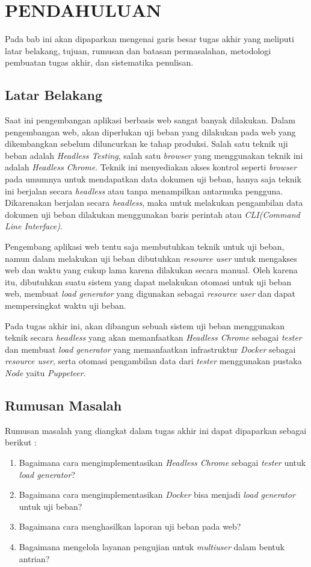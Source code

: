 \chapter{PENDAHULUAN}
	Pada bab ini akan dipaparkan mengenai garis besar tugas akhir yang meliputi latar belakang, tujuan, rumusan dan batasan permasalahan, metodologi pembuatan tugas akhir, dan sistematika penulisan.
        
	\section{Latar Belakang}
		Saat ini pengembangan aplikasi berbasis web sangat banyak dilakukan. Dalam pengembangan web, akan diperlukan uji beban yang dilakukan pada web yang dikembangkan sebelum diluncurkan ke tahap produksi. Salah satu teknik uji beban adalah \textit{Headless Testing}, salah satu \textit{browser} yang menggunakan teknik ini adalah \textit{Headless Chrome}. Teknik ini menyediakan akses kontrol seperti \textit{browser} pada umumnya untuk mendapatkan data dokumen uji beban, hanya saja teknik ini berjalan secara \textit{headless} atau tanpa menampilkan antarmuka pengguna. Dikarenakan berjalan secara \textit{headless}, maka untuk melakukan pengambilan data dokumen uji beban dilakukan menggunakan baris perintah atau \textit{CLI(Command Line Interface)}.
		
		\indent Pengembang aplikasi web tentu saja membutuhkan teknik untuk uji beban, namun dalam melakukan uji beban dibutuhkan \textit{resource user} untuk mengakses web dan waktu yang cukup lama karena dilakukan secara manual. Oleh karena itu, dibutuhkan suatu sistem yang dapat melakukan otomasi untuk uji beban web, membuat \textit{load generator} yang digunakan sebagai \textit{resource user} dan dapat mempersingkat waktu uji beban.
		
		\indent Pada tugas akhir ini, akan dibangun sebuah sistem uji beban menggunakan teknik secara \textit{headless} yang akan memanfaatkan \textit{Headless Chrome} sebagai \textit{tester} dan membuat \textit{load generator} yang memanfaatkan infrastruktur \textit{Docker} sebagai \textit{resource user}, serta otomasi pengambilan data dari \textit{tester} menggunakan pustaka \textit{Node} yaitu \textit{Puppeteer}\cite{puppeteer}.

	\section{Rumusan Masalah}
       	Rumusan masalah yang diangkat dalam tugas akhir ini dapat dipaparkan sebagai berikut :
		\begin{enumerate}
			\item Bagaimana cara mengimplementasikan \textit{Headless Chrome} sebagai \textit{tester} untuk \textit{load generator}?
			\item Bagaimana cara mengimplementasikan \textit{Docker} bisa menjadi \textit{load generator} untuk uji beban?
			\item Bagaimana cara menghasilkan laporan uji beban pada web?
			\item Bagaimana mengelola layanan pengujian untuk \textit{multiuser} dalam bentuk antrian?
		\end{enumerate}

